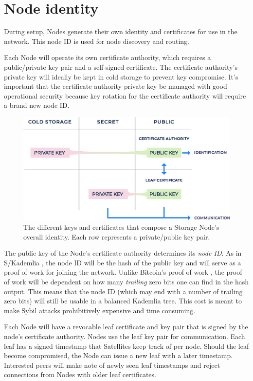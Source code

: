 \documentclass[8pt,fleqn,openany]{book}
\begin{document}
\section{Node identity}\label{sec:node-id}

During setup, Nodes generate their own identity and certificates for use in
the network.
This node ID is used for node discovery and routing.

Each Node will operate its own certificate authority, which requires a
public/private key pair and a self-signed certificate. The certificate
authority's private key will ideally be kept in cold storage to prevent key
compromise.
It's important that the certificate authority private key be managed with good
operational security because key rotation for the certificate authority will
require a brand new node ID.

\begin{figure}[!htbp]
\centering
\includegraphics[width=.8\textwidth]{images/identity.eps}
\caption{The different keys and certificates that compose a Storage Node's
overall identity. Each row represents a private/public key pair.}
\end{figure}

The public key of the Node's certificate authority determines its {\em node ID}.
As in S/Kademlia \cite{skad}, the node ID will be the hash of the public key
and will serve as a proof of work for joining the network. Unlike Bitcoin's
proof of work \cite{bitcoin}, the proof of work will be dependent on how many
{\em trailing}
zero bits one can find in the hash output. This means that the node ID (which
may end with a number of trailing zero bits) will
still be usable in a balanced Kademlia \cite{kad} tree.
This cost is meant to make Sybil attacks prohibitively expensive and time
consuming.

Each Node will have a revocable leaf certificate and key pair that is signed by
the node's certificate authority. Nodes use the leaf key pair for
communication. Each leaf has a signed timestamp that Satellites
keep track of per node. Should the leaf become compromised, the Node can issue
a new leaf with a later timestamp. Interested peers will make note of newly
seen leaf timestamps and reject connections from Nodes with older leaf
certificates.
\end{document}
